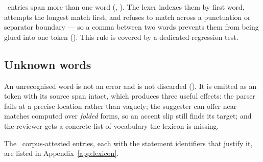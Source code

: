 \LexiconMultiword\ entries span more than one word (, ). The lexer indexes them by first word, attempts the longest match first, and
refuses to match across a punctuation or separator boundary --- so a comma between two words
prevents them from being glued into one token (). This rule is covered by a
dedicated regression test.

\subsection{Unknown words}

An unrecognised word is not an error and is not discarded (). It is emitted as
an  token with its source span intact, which produces three useful effects:
the parser fails at a precise location rather than vaguely; the suggester can offer near
matches computed over \emph{folded} forms, so an accent slip still finds its target; and
the reviewer gets a concrete list of vocabulary the lexicon is missing.

The \LexiconCorpus\ corpus-attested entries, each with the statement identifiers that
justify it, are listed in Appendix~\ref{app:lexicon}.
